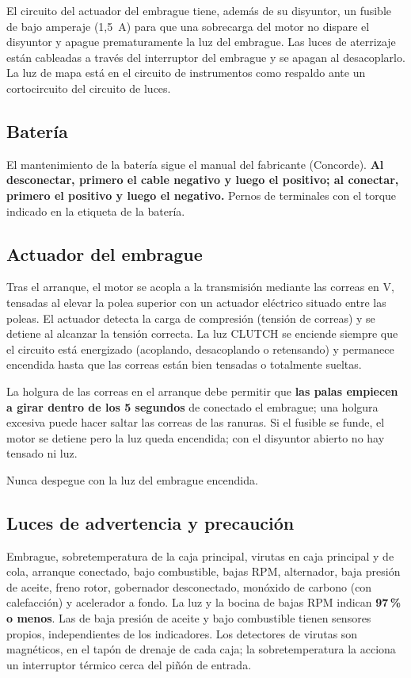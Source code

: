 El circuito del actuador del embrague tiene, además de su disyuntor, un fusible de bajo amperaje (1,5~A) para que una sobrecarga del motor no dispare el disyuntor y apague prematuramente la luz del embrague. Las luces de aterrizaje están cableadas a través del interruptor del embrague y se apagan al desacoplarlo. La luz de mapa está en el circuito de instrumentos como respaldo ante un cortocircuito del circuito de luces.

\subsection{Batería}

El mantenimiento de la batería sigue el manual del fabricante (Concorde). \textbf{Al desconectar, primero el cable negativo y luego el positivo; al conectar, primero el positivo y luego el negativo.} Pernos de terminales con el torque indicado en la etiqueta de la batería.

\subsection{Actuador del embrague}

Tras el arranque, el motor se acopla a la transmisión mediante las correas en V, tensadas al elevar la polea superior con un actuador eléctrico situado entre las poleas. El actuador detecta la carga de compresión (tensión de correas) y se detiene al alcanzar la tensión correcta. La luz CLUTCH se enciende siempre que el circuito está energizado (acoplando, desacoplando o retensando) y permanece encendida hasta que las correas están bien tensadas o totalmente sueltas.

La holgura de las correas en el arranque debe permitir que \textbf{las palas empiecen a girar dentro de los 5 segundos} de conectado el embrague; una holgura excesiva puede hacer saltar las correas de las ranuras. Si el fusible se funde, el motor se detiene pero la luz queda encendida; con el disyuntor abierto no hay tensado ni luz.

\begin{precaucion}
Nunca despegue con la luz del embrague encendida.
\end{precaucion}

\subsection{Luces de advertencia y precaución}

Embrague, sobretemperatura de la caja principal, virutas en caja principal y de cola, arranque conectado, bajo combustible, bajas RPM, alternador, baja presión de aceite, freno rotor, gobernador desconectado, monóxido de carbono (con calefacción) y acelerador a fondo. La luz y la bocina de bajas RPM indican \textbf{97\,\% o menos}. Las de baja presión de aceite y bajo combustible tienen sensores propios, independientes de los indicadores. Los detectores de virutas son magnéticos, en el tapón de drenaje de cada caja; la sobretemperatura la acciona un interruptor térmico cerca del piñón de entrada.

